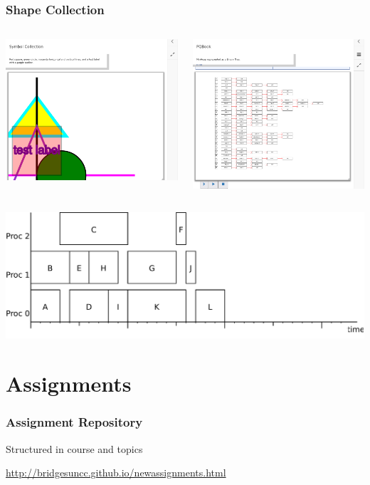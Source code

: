 \documentclass[aspectratio=169]{beamer}
\begin{document}
\begin{frame}
  \frametitle{Shape Collection}

  \begin{columns}
    \includegraphics[width=1\linewidth]{viz_figs/Shape1.png}

    \includegraphics[width=1\linewidth]{viz_figs/Shape2.png}
  \end{columns}  

  \includegraphics[width=.4\linewidth]{viz_figs/gantt-ls.pdf}
\end{frame}

\section{Assignments}

\begin{frame}
  \frametitle{Assignment Repository}

  Structured in course and topics

  \url{http://bridgesuncc.github.io/newassignments.html}
  

\end{frame}
\end{document}
